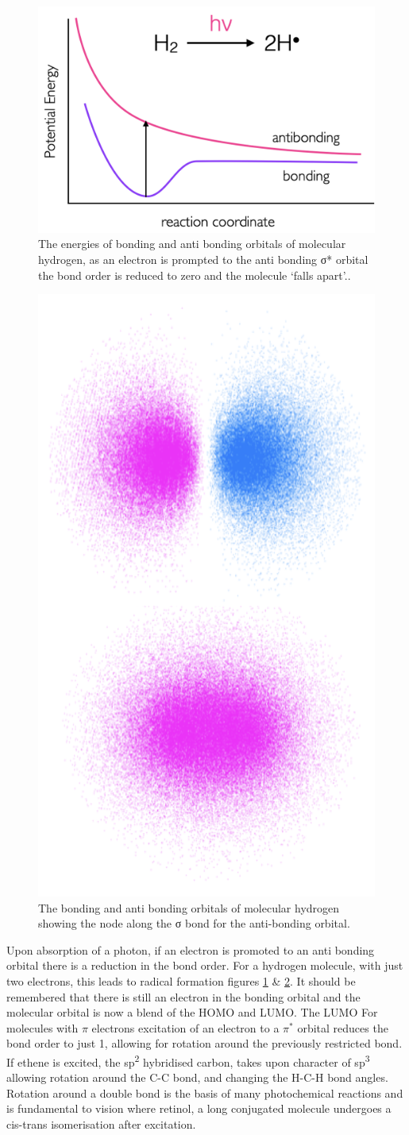 \documentclass[
]{book}
\begin{document}
\begin{figure}

{\centering \includegraphics[width=0.6\linewidth]{images/Hbondingen} 

}

\caption{The energies of  bonding and anti bonding orbitals of molecular hydrogen, as an electron is prompted to the anti bonding σ* orbital the bond order is reduced to zero and the molecule ‘falls apart’..}\label{fig:Hbondingen}
\end{figure}

\begin{figure}

{\centering \includegraphics[width=0.3\linewidth]{images/Hbondingorb} 

}

\caption{The bonding and anti bonding orbitals of molecular hydrogen showing the node along the σ bond for the anti-bonding orbital.}\label{fig:Hbondingorb}
\end{figure}

Upon absorption of a photon, if an electron is promoted to an anti bonding orbital there is a reduction in the bond order. For a hydrogen molecule, with just two electrons, this leads to radical formation figures \ref{fig:Hbondingen} \& \ref{fig:Hbondingorb}.
It should be remembered that there is still an electron in the bonding orbital and the molecular orbital is now a blend of the HOMO and LUMO. The LUMO
For molecules with \(\pi\) electrons excitation of an electron to a \(\pi ^\ast\) orbital reduces the bond order to just 1, allowing for rotation around the previously restricted bond. If ethene is excited, the sp\textsuperscript{2} hybridised carbon, takes upon character of sp\textsuperscript{3} allowing rotation around the C-C bond, and changing the H-C-H bond angles. Rotation around a double bond is the basis of many photochemical reactions and is fundamental to vision where retinol, a long conjugated molecule undergoes a cis-trans isomerisation after excitation.
\end{document}
